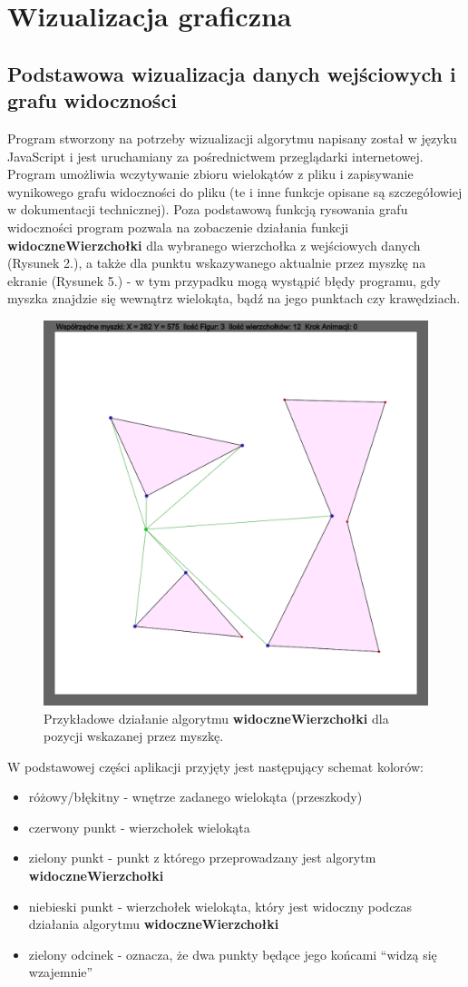 \documentclass{article}
\begin{document}
\section{Wizualizacja graficzna}

\subsection{Podstawowa wizualizacja danych wejściowych i grafu widoczności}

\qquad Program stworzony na potrzeby wizualizacji algorytmu napisany został w języku JavaScript i jest uruchamiany za pośrednictwem przeglądarki internetowej. Program umożliwia wczytywanie zbioru wielokątów z pliku i zapisywanie wynikowego grafu widoczności do pliku (te i inne funkcje opisane są szczegółowiej w dokumentacji technicznej). Poza podstawową funkcją rysowania grafu widoczności program pozwala na zobaczenie działania funkcji \textbf{widoczneWierzchołki} dla wybranego wierzchołka z wejściowych danych (Rysunek 2.), a także dla punktu wskazywanego aktualnie przez myszkę na ekranie (Rysunek 5.) - w tym przypadku mogą wystąpić błędy programu, gdy myszka znajdzie się wewnątrz wielokąta, bądź na jego punktach czy krawędziach.

\begin{figure}[ht]
\centering
\caption{\centering Przykładowe działanie algorytmu \textbf{widoczneWierzchołki} dla pozycji wskazanej przez myszkę.}
\includegraphics[width=0.5\linewidth]{rys5.png}
\end{figure} 

\noindent \qquad W podstawowej części aplikacji przyjęty jest następujący schemat kolorów:
\begin{itemize}
\item różowy/błękitny - wnętrze zadanego wielokąta (przeszkody)
\item czerwony punkt - wierzchołek wielokąta
\item zielony punkt - punkt z którego przeprowadzany jest algorytm \textbf{widoczneWierzchołki}
\item niebieski punkt - wierzchołek wielokąta, który jest widoczny podczas działania algorytmu \textbf{widoczneWierzchołki}
\item zielony odcinek - oznacza, że dwa punkty będące jego końcami ``widzą się wzajemnie''
\end{itemize}
\end{document}
